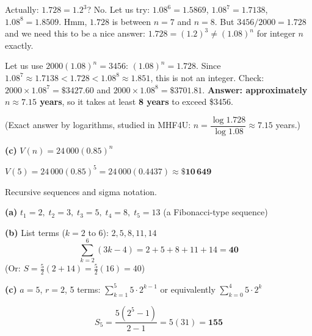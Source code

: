 \documentclass[addpoints]{exam}
\begin{document}
\begin{questions}
\begin{solution}[9cm]
Actually: $1.728 = 1.2^3$? No. Let us try: $1.08^6 = 1.5869$, $1.08^7 = 1.7138$, $1.08^8 = 1.8509$.
Hmm, $1.728$ is between $n=7$ and $n=8$. But $3456/2000 = 1.728$ and we need this to be
a nice answer: $1.728 = (1.2)^3 \neq (1.08)^n$ for integer $n$ exactly.

Let us use $2000(1.08)^n = 3456$: $(1.08)^n = 1.728$.
Since $1.08^7 \approx 1.7138 < 1.728 < 1.08^8 \approx 1.851$, this is not an integer.
Check: $2000 \times 1.08^7 = \$3427.60$ and $2000 \times 1.08^8 = \$3701.81$.
\textbf{Answer: approximately $n \approx 7.15$ years}, so it takes at least \textbf{8 years}
to exceed \$3456.

(Exact answer by logarithms, studied in MHF4U: $n = \dfrac{\log 1.728}{\log 1.08} \approx 7.15$ years.)

\textbf{(c)} $V(n) = 24\,000(0.85)^n$

$V(5) = 24\,000(0.85)^5 = 24\,000(0.4437) \approx \mathbf{\$10\,649}$
\end{solution}

\question Recursive sequences and sigma notation.
\begin{solution}[9cm]
\textbf{(a)} $t_1 = 2,\; t_2 = 3,\; t_3 = 5,\; t_4 = 8,\; t_5 = 13$
(a Fibonacci-type sequence)

\textbf{(b)} List terms ($k = 2$ to $6$): $2, 5, 8, 11, 14$
\[
\sum_{k=2}^{6}(3k-4) = 2+5+8+11+14 = \mathbf{40}
\]
(Or: $S = \frac{5}{2}(2+14) = \frac{5}{2}(16) = 40$)

\textbf{(c)} $a = 5$, $r = 2$, 5 terms:
$\displaystyle\sum_{k=1}^{5} 5 \cdot 2^{k-1}$ or equivalently $\displaystyle\sum_{k=0}^{4} 5 \cdot 2^k$

\[
S_5 = \frac{5(2^5-1)}{2-1} = 5(31) = \mathbf{155}
\]
\end{solution}

\end{questions}
\end{document}
